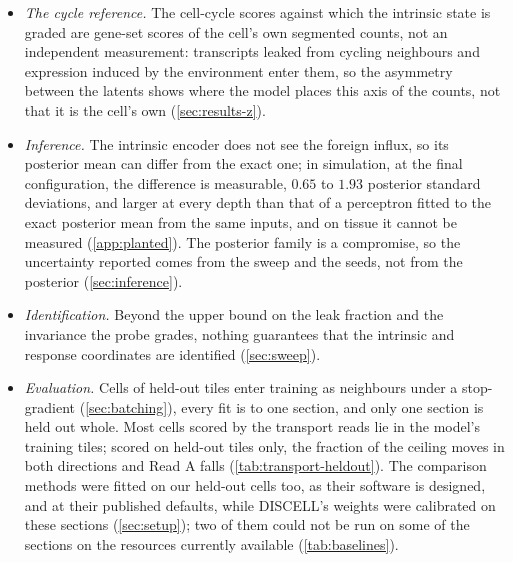 \begin{itemize}
\item \emph{The cycle reference.} The cell-cycle scores against which the intrinsic state is graded are gene-set scores of the cell's own segmented counts, not an independent measurement: transcripts leaked from cycling neighbours and expression induced by the environment enter them, so the asymmetry between the latents shows where the model places this axis of the counts, not that it is the cell's own (\cref{sec:results-z}).
\item \emph{Inference.} The intrinsic encoder does not see the foreign influx, so its posterior mean can differ from the exact one; in simulation, at the final configuration, the difference is measurable, $0.65$ to $1.93$ posterior standard deviations, and larger at every depth than that of a perceptron fitted to the exact posterior mean from the same inputs, and on tissue it cannot be measured (\cref{app:planted}). The posterior family is a compromise, so the uncertainty reported comes from the sweep and the seeds, not from the posterior (\cref{sec:inference}).
\item \emph{Identification.} Beyond the upper bound on the leak fraction and the invariance the probe grades, nothing guarantees that the intrinsic and response coordinates are identified (\cref{sec:sweep}).
\item \emph{Evaluation.} Cells of held-out tiles enter training as neighbours under a stop-gradient (\cref{sec:batching}), every fit is to one section, and only one section is held out whole. Most cells scored by the transport reads lie in the model's training tiles; scored on held-out tiles only, the fraction of the ceiling moves in both directions and Read A falls (\cref{tab:transport-heldout}). The comparison methods were fitted on our held-out cells too, as their software is designed, and at their published defaults, while DISCELL's weights were calibrated on these sections (\cref{sec:setup}); two of them could not be run on some of the sections on the resources currently available (\cref{tab:baselines}).
\end{itemize}
